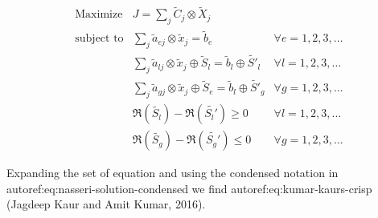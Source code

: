\documentclass[11pt,a4paper,final]{article}
\begin{document}
\begin{equation}
\label{eq:kumar-kaurs-fuzzy}
\begin{array}{lll}
\text{Maximize}   & J = \sum_j \tilde{C}_j \otimes \tilde{X}_j              &                                              \\
\text{subject to} & \sum_j \tilde{a}_{ej} \otimes \tilde{x}_j               = \tilde{b}_e & \forall e = 1,2,3,...                \\
                  & \sum_j \tilde{a}_{lj} \otimes \tilde{x}_j \oplus \tilde{S}_l = \tilde{b}_l \oplus \tilde{S'}_l & \forall l = 1,2,3,... \\
                  & \sum_j \tilde{a}_{gj} \otimes \tilde{x}_j \oplus \tilde{S}_e = \tilde{b}_l \oplus \tilde{S'}_g & \forall g = 1,2,3,... \\
                  & \mathfrak{R}(\tilde{S_l}) - \mathfrak{R}(\tilde{S_l'}) \ge 0                                     & \forall l = 1,2,3,...      \\
                  & \mathfrak{R}(\tilde{S_g}) - \mathfrak{R}(\tilde{S_g'}) \le 0                                     & \forall g = 1,2,3,...
\end{array}
\end{equation}

Expanding the set of equation and using the condensed notation in autoref:eq:nasseri-solution-condensed we find
autoref:eq:kumar-kaurs-crisp (Jagdeep Kaur and Amit Kumar, 2016).
\end{document}
